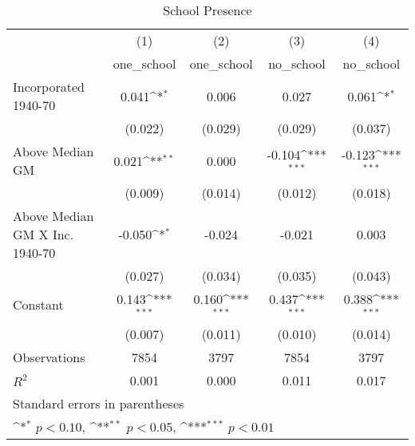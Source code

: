 \begin{table}[htbp]\centering
\def\sym#1{\ifmmode^{#1}\else\(^{#1}\)\fi}
\caption{School Presence}
\begin{tabular}{l*{4}{c}}
\hline\hline
                    &\multicolumn{1}{c}{(1)}&\multicolumn{1}{c}{(2)}&\multicolumn{1}{c}{(3)}&\multicolumn{1}{c}{(4)}\\
                    &\multicolumn{1}{c}{one\_school}&\multicolumn{1}{c}{one\_school}&\multicolumn{1}{c}{no\_school}&\multicolumn{1}{c}{no\_school}\\
\hline
Incorporated 1940-70&       0.041\sym{*}  &       0.006         &       0.027         &       0.061\sym{*}  \\
                    &     (0.022)         &     (0.029)         &     (0.029)         &     (0.037)         \\
[1em]
Above Median GM     &       0.021\sym{**} &       0.000         &      -0.104\sym{***}&      -0.123\sym{***}\\
                    &     (0.009)         &     (0.014)         &     (0.012)         &     (0.018)         \\
[1em]
Above Median GM X Inc. 1940-70&      -0.050\sym{*}  &      -0.024         &      -0.021         &       0.003         \\
                    &     (0.027)         &     (0.034)         &     (0.035)         &     (0.043)         \\
[1em]
Constant            &       0.143\sym{***}&       0.160\sym{***}&       0.437\sym{***}&       0.388\sym{***}\\
                    &     (0.007)         &     (0.011)         &     (0.010)         &     (0.014)         \\
\hline
Observations        &        7854         &        3797         &        7854         &        3797         \\
\(R^{2}\)           &       0.001         &       0.000         &       0.011         &       0.017         \\
\hline\hline
\multicolumn{5}{l}{\footnotesize Standard errors in parentheses}\\
\multicolumn{5}{l}{\footnotesize \sym{*} \(p<0.10\), \sym{**} \(p<0.05\), \sym{***} \(p<0.01\)}\\
\end{tabular}
\end{table}
